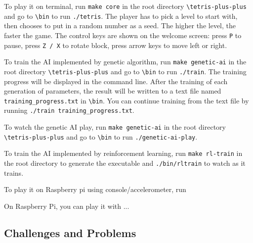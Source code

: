 \documentclass[11pt]{article}
\begin{document}
\begin{flushleft}
To play it on terminal, run \texttt{make core} in the root directory \texttt{\textbackslash tetris-plus-plus} and go to \texttt{\textbackslash bin} to run \texttt{./tetris}. The player has to pick a level to start with, then chooses to put in a random number as a seed. The higher the level, the faster the game. The control keys are shown on the welcome screen: press \texttt{P} to pause, press \texttt{Z / X} to rotate block, press arrow keys to move left or right.
\end{flushleft}

\begin{flushleft}
To train the AI implemented by genetic algorithm, run \texttt{make genetic-ai} in the root directory \texttt{\textbackslash tetris-plus-plus} and go to \texttt{\textbackslash bin} to run \texttt{./train}. The training progress will be displayed in the command line. After the training of each generation of parameters, the result will be written to a text file named \texttt{training\_progress.txt} in \texttt{\textbackslash bin}. You can continue training from the text file by running \texttt{./train training\_progress.txt}.
\end{flushleft}

\begin{flushleft}
To watch the genetic AI play, run \texttt{make genetic-ai} in the root directory \texttt{\textbackslash tetris-plus-plus} and go to \texttt{\textbackslash bin} to run \texttt{./genetic-ai-play}.
\end{flushleft}

\begin{flushleft}
To train the AI implemented by reinforcement learning, run \texttt{make rl-train} in the root directory to generate the executable and \texttt{./bin/rltrain} to watch as it trains.
\end{flushleft}

\begin{flushleft}
To play it on Raspberry pi using console/accelerometer, run 
\end{flushleft}

\begin{flushleft}
On Raspberry Pi, you can play it with ...
\end{flushleft}


\subsection{Challenges and Problems}
\end{document}
